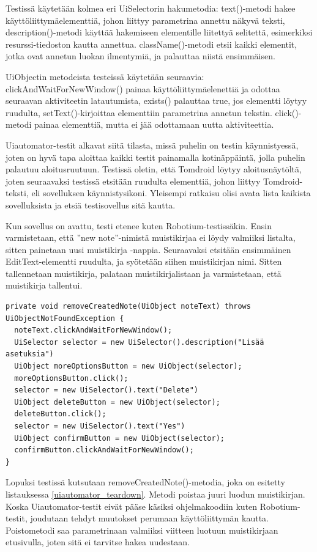 Testissä käytetään kolmea eri UiSelectorin hakumetodia: text()-metodi hakee käyttöliittymäelementtiä, johon liittyy parametrina annettu näkyvä teksti, description()-metodi käyttää hakemiseen elementille liitettyä selitettä, esimerkiksi resurssi-tiedoston kautta annettua. className()-metodi etsii kaikki elementit, jotka ovat annetun luokan ilmentymiä, ja palauttaa niistä ensimmäisen.

UiObjectin metodeista testeissä käytetään seuraavia: clickAndWaitForNewWindow() painaa käyttöliittymäelenettiä ja odottaa seuraavan aktiviteetin latautumista, exists() palauttaa true, jos elementti löytyy ruudulta, setText()-kirjoittaa elementtiin parametrina annetun tekstin. click()-metodi painaa elementtiä, mutta ei jää odottamaan uutta aktiviteettia.

Uiautomator-testit alkavat siitä tilasta, missä puhelin on testin käynnistyessä, joten on hyvä tapa aloittaa kaikki testit painamalla kotinäppäintä, jolla puhelin palautuu aloitusruutuun. Testissä oletin, että Tomdroid löytyy aloitusnäytöltä, joten seuraavaksi testissä etsitään ruudulta elementtiä, johon liittyy Tomdroid-teksti, eli sovelluksen käynnistysikoni. Yleisempi ratkaisu olisi avata lista kaikista sovelluksista ja etsiä testisovellus sitä kautta.

Kun sovellus on avattu, testi etenee kuten Robotium-testissäkin. Ensin varmistetaan, että ''new note''-nimistä muistikirjaa ei löydy valmiiksi listalta, sitten painetaan uusi muistikirja -nappia. Seuraavaksi etsitään ensimmäinen EditText-elementti ruudulta, ja syötetään siihen muistikirjan nimi. Sitten tallennetaan muistikirja, palataan muistikirjalistaan ja varmistetaan, että muistikirja tallentui.

\begin{lstlisting}[float,label=uiautomator_teardown,caption=Luodun muistikirjan poisto Uiautomatorilla] 
private void removeCreatedNote(UiObject noteText) throws UiObjectNotFoundException {
  noteText.clickAndWaitForNewWindow();
  UiSelector selector = new UiSelector().description("Lisää asetuksia")
  UiObject moreOptionsButton = new UiObject(selector);
  moreOptionsButton.click();
  selector = new UiSelector().text("Delete")
  UiObject deleteButton = new UiObject(selector);
  deleteButton.click();
  selector = new UiSelector().text("Yes")
  UiObject confirmButton = new UiObject(selector);
  confirmButton.clickAndWaitForNewWindow();
}
\end{lstlisting}

Lopuksi testissä kutsutaan removeCreatedNote()-metodia, joka on esitetty listauksessa \ref{uiautomator_teardown}. Metodi poistaa juuri luodun muistikirjan. Koska Uiautomator-testit eivät pääse käsiksi ohjelmakoodiin kuten Robotium-testit, joudutaan tehdyt muutokset perumaan käyttöliittymän kautta. Poistometodi saa parametrinaan valmiiksi viitteen luotuun muistikirjaan etusivulla, joten sitä ei tarvitse hakea uudestaan.

